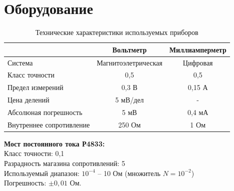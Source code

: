 \documentclass[12pt]{article}
\begin{document}
    \section{Оборудование}
    \begin{table}[H]
        \caption{Технические характеристики используемых приборов}
        \begin{tabular}{|l|c|c|}
        \hline
        \multicolumn{1}{|c|}{}   & Вольтметр           & Миллиамперметр   \\ \hline
        Система                  & Магнитоэлетрическая & Цифровая         \\ \hline
        Класс точности           & 0,5                 & 0,5              \\ \hline
        Предел измерений         & 0,3 В               & 0,15 А           \\ \hline
        Цена делений             & 5 мВ/дел            & -                \\ \hline
        Абсолюная погрешность    & 5 мВ                & 0,4 мА           \\ \hline
        Внутреннее сопротивление & 250 Ом              & 1 Ом             \\ \hline
        \end{tabular}
    \end{table}
    \textbf{Мост постоянного тока Р4833: \\}
    Класс точности: 0,1\\
    Разрадность магазина сопротивлений: 5\\
    Используемый диапазон: $10^{-4}$ -- 10 Ом (множитель $N = 10^{-2}$)\\
    Погрешность: $\pm0,01$ Ом.
\end{document}
